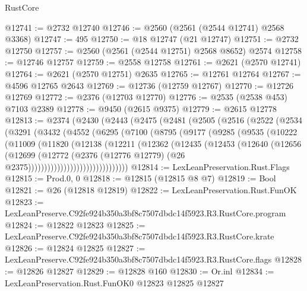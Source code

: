 \begin{lexlean}{RustCore}
\begin{coremodule}
@12741 := @2732 @12740
@12746 := @2560 (@2561 (@2544 @12741) @2568 @3368)
@12747 := 495
@12750 := @18 @12747 (@21 @12747)
@12751 := @2732 @12750
@12757 := @2560 (@2561 (@2544 @12751) @2568 @8652) @2574
@12758 := @12746 @12757
@12759 := @2558 @12758
@12761 := @2621 (@2570 @12741)
@12764 := @2621 (@2570 @12751) @2635
@12765 := @12761 @12764
@12767 := @4596 @12765 @2643
@12769 := @12736 (@12759 @12767)
@12770 := @12726 @12769
@12772 := @2376 (@12703 @12770)
@12776 := @2535 (@2538 @453) @7103 @2389
@12778 := @9450 (@2615 @9375)
@12779 := @2615 @12778
@12813 := @2374
    (@2430
      (@2443
        (@2475
          (@2481
            (@2505
              (@2516
                (@2522
                  (@2534
                    (@3291
                      (@3432
                        (@4552
                          (@6295
                            (@7100
                              (@8795
                                (@9177
                                  (@9285
                                    (@9535
                                      (@10222
                                        (@11009
                                          (@11820
                                            (@12138
                                              (@12211
                                                (@12362
                                                  (@12435
                                                    (@12453
                                                      (@12640
                                                        (@12656
                                                          (@12699
                                                            (@12772
                                                              (@2376
                                                                (@12776 @12779)
                                                                (@26
                                                                  @2375)))))))))))))))))))))))))))))))
@12814 := LexLeanPreservation.Rust.Flags
@12815 := Prod.{0, 0}
@12818 := @12815 (@12815 @8 @7)
@12819 := Bool
@12821 := @26 (@12818 @12819)
@12822 := LexLeanPreservation.Rust.FunOK
@12823 := LexLeanPreserve.C92fe924b350a3bf8c7507dbdc14f5923.R3.RustCore.program
@12824 := @12822 @12823
@12825 := LexLeanPreserve.C92fe924b350a3bf8c7507dbdc14f5923.R3.RustCore.krate
@12826 := @12824 @12825
@12827 := LexLeanPreserve.C92fe924b350a3bf8c7507dbdc14f5923.R3.RustCore.flags
@12828 := @12826 @12827
@12829 := @12828 @160
@12830 := Or.inl
@12834 := LexLeanPreservation.Rust.FunOK0 @12823 @12825 @12827

\end{coremodule}
\end{lexlean}
